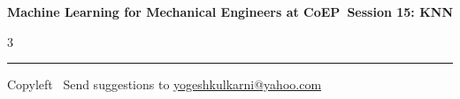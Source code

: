 \documentclass[8pt,landscape]{article}
\begin{document}
\footnotesize

\begin{center}
\Large{\textbf{Machine Learning for Mechanical Engineers at CoEP\ Session 15: KNN}}
\end{center}

\begin{multicols}{3}

\end{multicols}

\rule{\linewidth}{0.25pt}
\scriptsize
Copyleft \textcopyleft\  Send suggestions to
\href{http://www.yogeshkulkarni.com}{yogeshkulkarni@yahoo.com}
\end{document}
